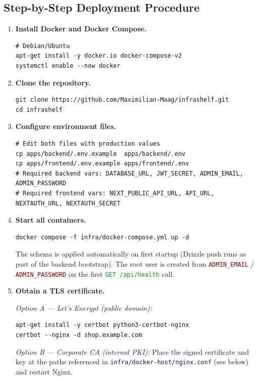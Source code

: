 \documentclass[12pt,a4paper,twoside]{report}
\newcommand{\file}[1]{\texttt{\textcolor{MidnightBlue}{#1}}}
\newcommand{\route}[1]{\texttt{\textcolor{ForestGreen}{#1}}}
\newcommand{\env}[1]{\texttt{\textcolor{Maroon}{#1}}}
\begin{document}
\subsection*{Step-by-Step Deployment Procedure}

\begin{enumerate}

\item \textbf{Install Docker and Docker Compose.}
\begin{lstlisting}[style=bash]
# Debian/Ubuntu
apt-get install -y docker.io docker-compose-v2
systemctl enable --now docker
\end{lstlisting}

\item \textbf{Clone the repository.}
\begin{lstlisting}[style=bash]
git clone https://github.com/Maximilian-Maag/infrashelf.git
cd infrashelf
\end{lstlisting}

\item \textbf{Configure environment files.}
\begin{lstlisting}[style=bash]
# Edit both files with production values
cp apps/backend/.env.example  apps/backend/.env
cp apps/frontend/.env.example apps/frontend/.env
# Required backend vars: DATABASE_URL, JWT_SECRET, ADMIN_EMAIL, ADMIN_PASSWORD
# Required frontend vars: NEXT_PUBLIC_API_URL, API_URL, NEXTAUTH_URL, NEXTAUTH_SECRET
\end{lstlisting}

\item \textbf{Start all containers.}
\begin{lstlisting}[style=bash]
docker compose -f infra/docker-compose.yml up -d
\end{lstlisting}

The schema is applied automatically on first startup (Drizzle push runs
as part of the backend bootstrap). The root user is created from
\env{ADMIN\_EMAIL} / \env{ADMIN\_PASSWORD} on the first \route{GET /api/health} call.

\item \textbf{Obtain a TLS certificate.}

\textit{Option A — Let's Encrypt (public domain):}
\begin{lstlisting}[style=bash]
apt-get install -y certbot python3-certbot-nginx
certbot --nginx -d shop.example.com
\end{lstlisting}

\textit{Option B — Corporate CA (internal PKI):} Place the signed
certificate and key at the paths referenced in
\file{infra/docker-host/nginx.conf} (see below) and restart Nginx.


\end{enumerate}
\end{document}
